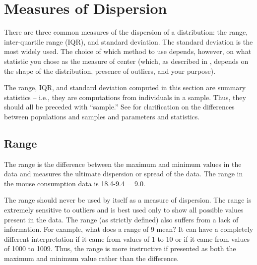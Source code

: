\documentclass[10pt,openany]{book}\usepackage[]{graphicx}\usepackage[]{color}
\begin{document}
\vspace{-18pt}
\section{Measures of Dispersion}
\vspace{-12pt}
There are three common measures of the dispersion of a distribution: the range, inter-quartile range (IQR), and standard deviation.  The standard deviation is the most widely used.  The choice of which method to use depends, however, on what statistic you chose as the measure of center (which, as described in , depends on the shape of the distribution, presence of outliers, and your purpose).

The range, IQR, and standard deviation computed in this section are summary statistics -- i.e., they are computations from individuals in a sample.  Thus, they should all be preceded with ``sample.''  See  for clarification on the differences between populations and samples and parameters and statistics.


\vspace{-12pt}

\subsection{Range}
The range is the difference between the maximum and minimum values in the data and measures the ultimate dispersion or spread of the data. The range in the mouse consumption data  is 18.4-9.4 = 9.0.

The range should never be used by itself as a measure of dispersion.  The range is extremely sensitive to outliers and is best used only to show all possible values present in the data.  The range (as strictly defined) also suffers from a lack of information.  For example, what does a range of 9 mean?  It can have a completely different interpretation if it came from values of 1 to 10 or if it came from values of 1000 to 1009.  Thus, the range is more instructive if presented as both the maximum and minimum value rather than the difference.
\end{document}
